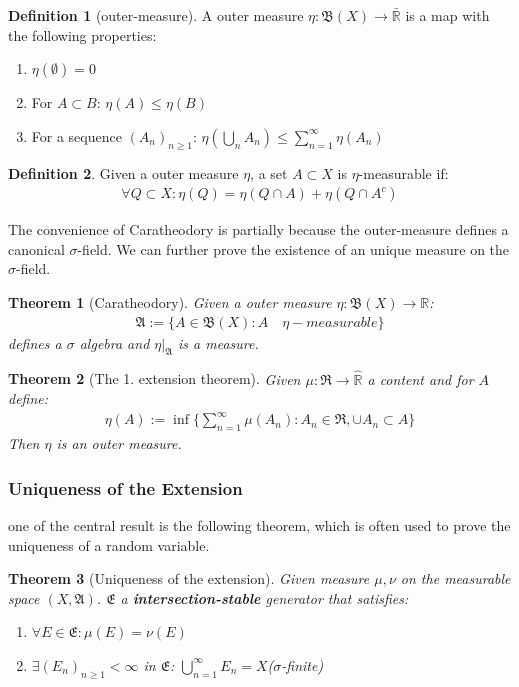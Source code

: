 \documentclass[a4paper,11pt,oneside,fleqn]{book}
\newtheorem{theorem}{Theorem}[section]
\theoremstyle{definition}
\newtheorem{definition}{Definition}[section]
\theoremstyle{remark}
\begin{document}
\begin{definition}[outer-measure]
	A outer measure $\eta: \mathfrak{B}(X) \rightarrow \bar{\mathbb{R}}$ is a map with the following properties:
	\begin{enumerate}
		\item $\eta(\emptyset) = 0$
		\item For $A \subset B$: $\eta(A) \leq \eta(B)$
		\item For a sequence $(A_n)_{n \geq 1}$: $\eta(\bigcup_n A_n) \leq \sum_{n = 1}^\infty \eta(A_n)$
	\end{enumerate}
\end{definition}

\begin{definition}
	Given a outer measure $\eta$, a set $A \subset X$ is $\eta$-measurable if:
	\begin{align*}
		\forall Q \subset X: \eta(Q) = \eta(Q \cap A) + \eta(Q \cap A^c)
	\end{align*}
\end{definition}

The convenience of Caratheodory is partially because the outer-measure defines a canonical $\sigma$-field. We can further prove the existence of an unique measure on the $\sigma$-field.
\begin{theorem}[Caratheodory]
	Given a outer measure $\eta: \mathfrak{B}(X) \rightarrow \mathbb{R}$:
	\begin{align*}
		\mathfrak{A}:= \{ A \in \mathfrak{B}(X): A \quad \eta-measurable \}
	\end{align*}
	defines a $\sigma$ algebra and $\eta|_{\mathfrak{A}}$ is a measure.
\end{theorem}

\begin{theorem}[The 1. extension theorem]
	Given $\mu: \mathfrak{R} \rightarrow \widehat{\mathbb{R}}$ a content and for $A$ define:
	\begin{align*}
		\eta(A):= \inf\{\sum_{n = 1}^\infty \mu(A_n): A_n \in \mathfrak{R}, \cup A_n \subset A \}
	\end{align*}
	Then $\eta$ is an outer measure.
\end{theorem}

\subsubsection*{Uniqueness of the Extension}
one of the central result is the following theorem, which is often used to prove the uniqueness of a random variable.
\begin{theorem}[Uniqueness of the extension]
	Given measure $\mu, \nu$ on the measurable space $(X, \mathfrak{A})$. $\mathfrak{E}$ a \textbf{intersection-stable }generator that satisfies:
	\begin{enumerate}
		\item $\forall E \in \mathfrak{E}: \mu(E) = \nu(E)$
		\item $\exists (E_n)_{n\geq 1} < \infty$ in $\mathfrak{E}$: $\bigcup_{n = 1}^\infty E_n = X$($\sigma$-finite)
	\end{enumerate}
\end{theorem}
\end{document}
